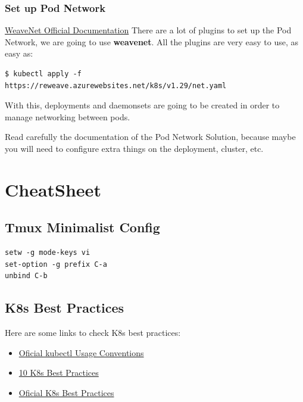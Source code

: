 \documentclass{article}
\newenvironment{blocktemplateIII}[1]{%
    \tcolorbox[beamer,%
    noparskip,breakable,
    ,colframe=Red,%
    colbacklower=LimeGreen!75!LightGreen,%
    title=#1]}%
    {\endtcolorbox}
\newenvironment{codetemplate}[1][]{%
  \mybasecolorbox[#1]
  \itshape
}{%
  \endmybasecolorbox
}
\begin{document}
\subsubsection{Set up Pod Network}
\href{https://rajch.github.io/weave/}{WeaveNet Official Documentation}
There are a lot of plugins to set up the Pod Network, we are going to use \textbf{weavenet}. All the plugins are very easy to use, as easy as:
\begin{codetemplate}{}
\begin{verbatim}
$ kubectl apply -f https://reweave.azurewebsites.net/k8s/v1.29/net.yaml
\end{verbatim}
\end{codetemplate}

With this, deployments and daemonsets are going to be created in order to manage networking between pods.

\begin{blocktemplateIII}{WARNING}
Read carefully the documentation of the Pod Network Solution, because maybe you will need to configure extra things on the deployment, cluster, etc.
\end{blocktemplateIII}

\newpage
\section{CheatSheet}
\subsection{Tmux Minimalist Config}
\begin{codetemplate}{}
\begin{verbatim}
setw -g mode-keys vi
set-option -g prefix C-a
unbind C-b
\end{verbatim}
\end{codetemplate}

\subsection{K8s Best Practices}

Here are some links to check K8s best practices:

\begin{itemize}
    \item \href{https://kubernetes.io/docs/reference/kubectl/conventions/}{Oficial kubectl Usage Conventions}
    \item \href{https://www.densify.com/kubernetes-tools/kubernetes-best-practices/}{10 K8s Best Practices}
    \item \href{https://kubernetes.io/docs/concepts/configuration/overview/}{Oficial K8s Best Practices}
\end{itemize}
\end{document}
